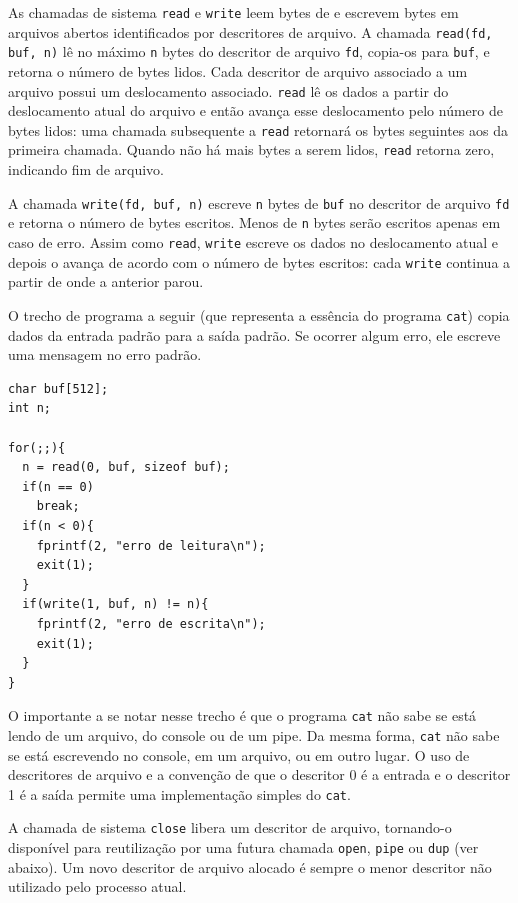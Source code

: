 As chamadas de sistema
\lstinline{read}
e
\lstinline{write}
leem bytes de e escrevem bytes em
arquivos abertos identificados por descritores de arquivo.
A chamada
\lstinline{read(fd, buf, n)}
lê no máximo
\lstinline{n}
bytes do descritor de arquivo
\lstinline{fd},
copia-os para
\lstinline{buf},
e retorna o número de bytes lidos.
Cada descritor de arquivo associado a um arquivo
possui um deslocamento associado.
\lstinline{read}
lê os dados a partir do deslocamento atual do arquivo e então avança
esse deslocamento pelo número de bytes lidos:
uma chamada subsequente a
\lstinline{read}
retornará os bytes seguintes aos da primeira chamada.
Quando não há mais bytes a serem lidos,
\lstinline{read}
retorna zero, indicando fim de arquivo.

A chamada
\lstinline{write(fd, buf, n)}
escreve
\lstinline{n}
bytes de
\lstinline{buf}
no descritor de arquivo
\lstinline{fd}
e retorna o número de bytes escritos.
Menos de
\lstinline{n}
bytes serão escritos apenas em caso de erro.
Assim como
\lstinline{read},
\lstinline{write}
escreve os dados no deslocamento atual e depois o avança
de acordo com o número de bytes escritos:
cada
\lstinline{write}
continua a partir de onde a anterior parou.

O trecho de programa a seguir (que representa a essência do programa
\lstinline{cat})
copia dados da entrada padrão
para a saída padrão. Se ocorrer algum erro, ele escreve uma mensagem
no erro padrão.
\begin{lstlisting}[]
char buf[512];
int n;

for(;;){
  n = read(0, buf, sizeof buf);
  if(n == 0)
    break;
  if(n < 0){
    fprintf(2, "erro de leitura\n");
    exit(1);
  }
  if(write(1, buf, n) != n){
    fprintf(2, "erro de escrita\n");
    exit(1);
  }
}
\end{lstlisting}
O importante a se notar nesse trecho é que o programa
\lstinline{cat}
não sabe se está lendo de um arquivo, do console ou de um pipe.
Da mesma forma,
\lstinline{cat}
não sabe se está escrevendo no console, em um arquivo, ou em outro lugar.
O uso de descritores de arquivo e a convenção de que o descritor 0
é a entrada e o descritor 1 é a saída permite uma implementação
simples do
\lstinline{cat}.

A chamada de sistema
\lstinline{close}
libera um descritor de arquivo, tornando-o disponível para reutilização por uma futura
chamada
\lstinline{open},
\lstinline{pipe}
ou
\lstinline{dup}
(ver abaixo).
Um novo descritor de arquivo alocado
é sempre o menor descritor não utilizado
pelo processo atual.

